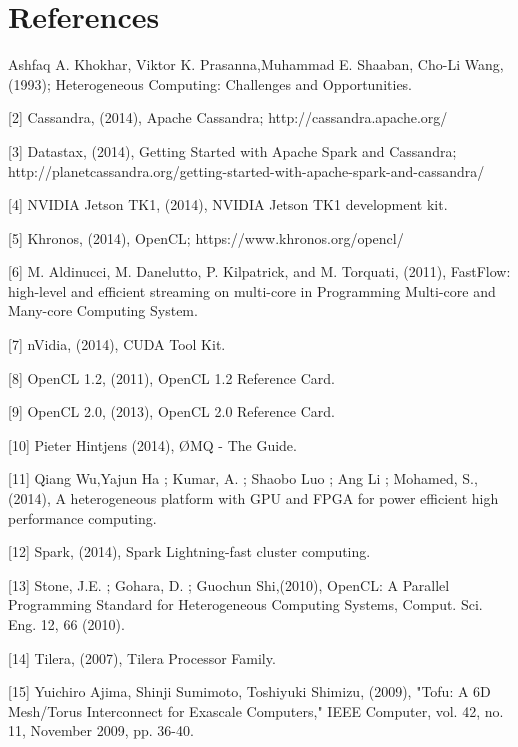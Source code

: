\documentclass{acm_proc_article-sp}
\begin{document}
\section{References}
\begin{small}
[1] Ashfaq A. Khokhar, Viktor K. Prasanna,Muhammad E. Shaaban, Cho-Li Wang, (1993); Heterogeneous Computing: Challenges and Opportunities. 

[2] Cassandra, (2014), Apache Cassandra; http://cassandra.apache.org/ 

[3] Datastax, (2014), Getting Started with Apache Spark and Cassandra; 
http://planetcassandra.org/getting-started-with-apache-spark-and-cassandra/
 
[4] NVIDIA Jetson TK1, (2014), NVIDIA Jetson TK1 development kit.

[5] Khronos, (2014), OpenCL; https://www.khronos.org/opencl/

[6] M. Aldinucci, M. Danelutto, P. Kilpatrick, and M. Torquati, (2011), 
FastFlow: high-level and efficient streaming on multi-core in Programming Multi-core and Many-core Computing System.

[7] nVidia, (2014), CUDA Tool Kit.

[8] OpenCL 1.2, (2011), OpenCL 1.2 Reference Card.

[9] OpenCL 2.0, (2013), OpenCL 2.0 Reference Card.

[10] Pieter Hintjens (2014), ØMQ - The Guide.

[11] Qiang Wu,Yajun Ha ; Kumar, A. ; Shaobo Luo ; Ang Li ; Mohamed, S., (2014), A heterogeneous platform with GPU and FPGA for power efficient high performance computing.

[12] Spark, (2014), Spark Lightning-fast cluster computing.

[13] Stone, J.E. ; Gohara, D. ; Guochun Shi,(2010), OpenCL: A Parallel Programming Standard for Heterogeneous Computing Systems, Comput. Sci. Eng. 12, 66 (2010).

[14] Tilera, (2007), Tilera Processor Family.

[15] Yuichiro Ajima, Shinji Sumimoto, Toshiyuki Shimizu, (2009), "Tofu: A 6D Mesh/Torus Interconnect for Exascale Computers," IEEE Computer, vol. 42, no. 11, November 2009, pp. 36-40.
\end{small}
\end{document}
